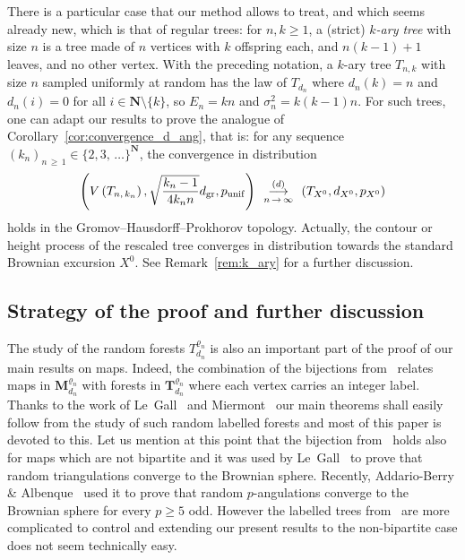 \documentclass[AHL,Unicode,longabstracts,published]{cedram}
\newcommand{\ensembles}[1]{\mathbf{#1}}
\newcommand{\N}{\ensembles{N}}
\newcommand{\1}{\ensembles{1}}
\newcommand{\Tree}{\mathbf{T}}
\newcommand{\Map}{\mathbf{M}}
\renewcommand{\ge}{\geqslant}
\newcommand{\CRT}{T}
\newcommand{\dCRT}{d}
\newcommand{\pCRT}{p}
\newcommand{\Mn}{\Map_{d_n}^{\varrho_n}}
\newcommand{\dgr}{d_{\mathrm{gr}}}
\newcommand{\pgr}{p_{\mathrm{unif}}}
\newcommand{\fn}{T_{d_n}^{\varrho_n}}
\newcommand{\tn}{T_{d_n}}
\newcommand{\edges}{E}
\newcommand{\cvloi}[1][n]{\enskip\mathop{\longrightarrow}^{(d)}_{#1\,\to\, \infty}\enskip}
\begin{document}
There is a particular case that our method allows to treat, and which seems already new, which is that of regular trees: for $n,k\ge1$, a (strict) \emph{$k$-ary tree} with size $n$ is a tree made of $n$ vertices with $k$ offspring each, and $n(k-1) + 1$ leaves, and no other vertex. With the preceding notation, a $k$-ary tree $T_{n,k}$ with size $n$ sampled uniformly at random has the law of $\tn$ where $d_{n}(k) = n$ and $d_{n}(i) = 0$ for all $i\in \N\setminus\{k\}$, so $\edges_n = k n$ and $\sigma_{n}^{2} = k(k-1)n$. For such trees, one can adapt our results to prove the analogue of Corollary~\ref{cor:convergence_d_ang}, that is: for any sequence $(k_{n})_{n\,\ge\,1} \in \{2, 3, \,\dots\}^\N$, the convergence in distribution
\begin{equation}\label{eq:arbres_k_aires}
\left(V\left(T_{n,\,k_{n}}\right), \sqrt{\frac{k_{n}-1}{4 k_{n} n}} \dgr, \pgr\right) \cvloi \left(\CRT_{X^0}, \dCRT_{X^0}, \pCRT_{X^0}\right)
\end{equation}
holds in the Gromov--Hausdorff--Prokhorov topology. Actually, the contour or height process of the rescaled tree converges in distribution towards the standard Brownian excursion $X^{0}$. See Remark~\ref{rem:k_ary} for a further discussion.



\subsection{Strategy of the proof and further discussion}

The study of the random forests $\fn$ is also an important part of the proof of our main results on maps. Indeed, the combination of the bijections from~\cite{BDG04, JS15} relates maps in $\Mn$ with forests in $\Tree_{d_n}^{\varrho_n}$ where each vertex carries an integer label. Thanks to the work of Le~Gall~\cite{LG13} and Miermont~\cite{Mie13} our main theorems shall easily follow from the study of such random labelled forests and most of this paper is devoted to this. Let us mention at this point that the bijection from~\cite{BDG04} holds also for maps which are not bipartite and it was used by Le~Gall~\cite{LG13} to prove that random triangulations converge to the Brownian sphere. Recently, Addario-Berry \& Albenque~\cite{ABA21} used it to prove that random $p$-angulations converge to the Brownian sphere for every $p \ge 5$ odd. However the labelled trees from~\cite{BDG04} are more complicated to control and extending our present results to the non-bipartite case does not seem technically easy.
\end{document}
